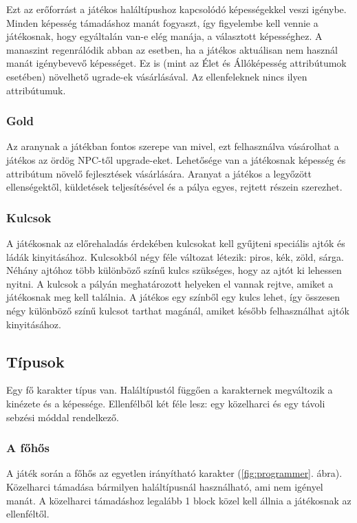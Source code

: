 \documentclass[a4paper]{article}
\begin{document}
Ezt az erőforrást a játékos haláltípushoz kapcsolódó képességekkel veszi igénybe.
Minden képesség támadáshoz manát fogyaszt, így figyelembe kell vennie a játékosnak, hogy egyáltalán van-e elég manája, a választott képességhez.
A manaszint regenrálódik abban az esetben, ha a játékos aktuálisan nem használ manát igénybevevő képességet.
Ez is (mint az Élet és Állóképesség attribútumok esetében) növelhető ugrade-ek vásárlásával.
Az ellenfeleknek nincs ilyen attribútumuk.

\subsubsection{Gold}

Az aranynak a játékban fontos szerepe van mivel, ezt felhasználva vásárolhat a játékos az ördög NPC-től upgrade-eket.
Lehetősége van a játékosnak képesség és attribútum növelő fejlesztések vásárlására.
Aranyat a játékos a legyőzött ellenségektől, küldetések teljesítésével és a pálya egyes, rejtett részein szerezhet.

\subsubsection{Kulcsok}

A játékosnak az előrehaladás érdekében kulcsokat kell gyűjteni speciális ajtók és ládák kinyitásához.
Kulcsokból négy féle változat létezik: piros, kék, zöld, sárga.
Néhány ajtóhoz több különböző színű kulcs szükséges, hogy az ajtót ki lehessen nyitni.
A kulcsok a pályán meghatározott helyeken el vannak rejtve, amiket a játékosnak meg kell találnia.
A játékos egy színből egy kulcs lehet, így összesen négy különböző színű kulcsot tarthat magánál, amiket később felhasználhat ajtók kinyitásához.

\subsection{Típusok}

Egy fő karakter típus van. Haláltípustól függően a karakternek megváltozik a kinézete és a képessége.
Ellenfélből két féle lesz: egy közelharci és egy távoli sebzési móddal rendelkező.

\subsubsection{A főhős}

A játék során a főhős az egyetlen irányítható karakter (\ref{fig:programmer}. ábra). Közelharci támadása bármilyen haláltípusnál használható, ami nem igényel manát.
A közelharci támadáshoz legalább 1 block közel kell állnia a játékosnak az ellenféltől.
\end{document}
